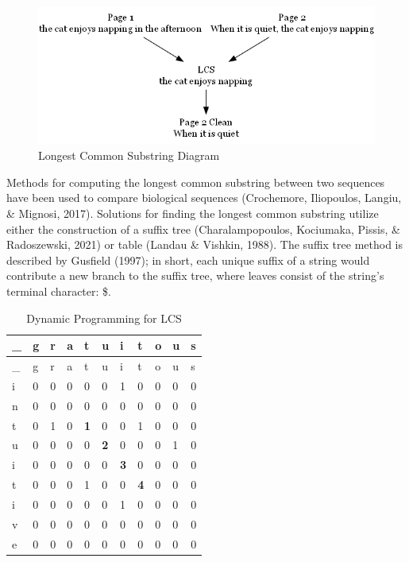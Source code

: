 \documentclass[print]{nuthesis}
\begin{document}
\begin{figure}

{\centering \includegraphics[width=\linewidth]{images/svg_graph} 

}

\caption{Longest Common Substring Diagram}\label{fig:lcs}
\end{figure}

Methods for computing the longest common substring between two sequences have been used to compare biological sequences (Crochemore, Iliopoulos, Langiu, \& Mignosi, 2017).
Solutions for finding the longest common substring utilize either the construction of a suffix tree (Charalampopoulos, Kociumaka, Pissis, \& Radoszewski, 2021) or table (Landau \& Vishkin, 1988).
The suffix tree method is described by Gusfield (1997); in short, each unique suffix of a string would contribute a new branch to the suffix tree, where leaves consist of the string's terminal character: \$.

\begin{longtable}[]{@{}lllllllllll@{}}
\caption{Dynamic Programming for LCS \label{tab:dylcs}}\tabularnewline
\toprule\noalign{}
\_ & g & r & a & t & u & i & t & o & u & s \\
\midrule\noalign{}
\endfirsthead
\toprule\noalign{}
\_ & g & r & a & t & u & i & t & o & u & s \\
\midrule\noalign{}
\endhead
\bottomrule\noalign{}
\endlastfoot
i & 0 & 0 & 0 & 0 & 0 & 1 & 0 & 0 & 0 & 0 \\
n & 0 & 0 & 0 & 0 & 0 & 0 & 0 & 0 & 0 & 0 \\
t & 0 & 1 & 0 & \textbf{1} & 0 & 0 & 1 & 0 & 0 & 0 \\
u & 0 & 0 & 0 & 0 & \textbf{2} & 0 & 0 & 0 & 1 & 0 \\
i & 0 & 0 & 0 & 0 & 0 & \textbf{3} & 0 & 0 & 0 & 0 \\
t & 0 & 0 & 0 & 1 & 0 & 0 & \textbf{4} & 0 & 0 & 0 \\
i & 0 & 0 & 0 & 0 & 0 & 1 & 0 & 0 & 0 & 0 \\
v & 0 & 0 & 0 & 0 & 0 & 0 & 0 & 0 & 0 & 0 \\
e & 0 & 0 & 0 & 0 & 0 & 0 & 0 & 0 & 0 & 0 \\
\end{longtable}
\end{document}
